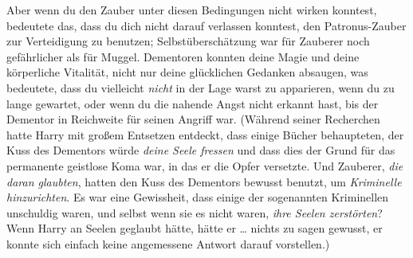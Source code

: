 Aber wenn du den Zauber unter diesen Bedingungen nicht wirken konntest, bedeutete das, dass du dich nicht darauf verlassen konntest, den Patronus-Zauber zur Verteidigung zu benutzen; Selbstüberschätzung war für Zauberer noch gefährlicher als für Muggel. Dementoren konnten deine Magie und deine körperliche Vitalität, nicht nur deine glücklichen Gedanken absaugen, was bedeutete, dass du vielleicht \emph{nicht} in der Lage warst zu apparieren, wenn du zu lange gewartet, oder wenn du die nahende Angst nicht erkannt hast, bis der Dementor in Reichweite für seinen Angriff war. (Während seiner Recherchen hatte Harry mit großem Entsetzen entdeckt, dass einige Bücher behaupteten, der Kuss des Dementors würde \emph{deine Seele fressen} und dass dies der Grund für das permanente geistlose Koma war, in das er die Opfer versetzte. Und Zauberer, \emph{die daran glaubten}, hatten den Kuss des Dementors bewusst benutzt, um \emph{Kriminelle hinzurichten}. Es war eine Gewissheit, dass einige der sogenannten Kriminellen unschuldig waren, und selbst wenn sie es nicht waren, \emph{ihre Seelen zerstörten}? Wenn Harry an Seelen geglaubt hätte, hätte er … nichts zu sagen gewusst, er konnte sich einfach keine angemessene Antwort darauf vorstellen.)

